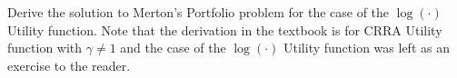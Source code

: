 \documentclass[12pt]{exam}
\begin{document}
\begin{questions}
\question Derive the solution to Merton's Portfolio problem for the case of the $\log(\cdot)$ Utility function. Note that the derivation in the textbook is for CRRA Utility function with $\gamma \neq 1$ and the case of the $\log(\cdot)$ Utility function was left as an exercise to the reader.



\end{questions}
\end{document}
